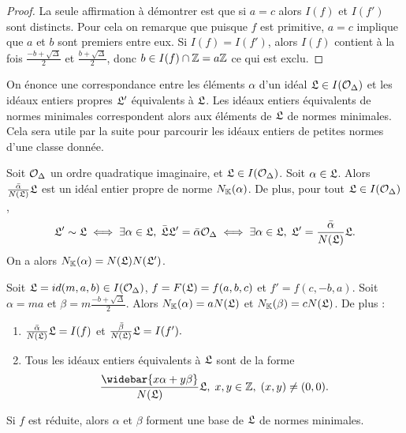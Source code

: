 \begin{proof}
	La seule affirmation à démontrer est que si $a = c$ alors $I(f)$ et $I(f')$ sont distincts. Pour cela on remarque que puisque $f$ est primitive, $a = c$ implique que $a$ et $b$ sont premiers entre eux. Si $I(f) = I(f')$, alors $I(f)$ contient à la fois $\frac{-b + \sqrt{\Delta}}{2}$ et $\frac{b + \sqrt{\Delta}}{2}$, donc $b\in I(f)\cap\mathbb{Z} = a\mathbb{Z}$ ce qui est exclu. 
\end{proof}

On énonce une correspondance entre les éléments $\alpha$ d'un idéal $\mathfrak{L}\in I(\mathcal{O}_{\Delta})$ et les idéaux entiers propres $\mathfrak{L}'$ équivalents à $\mathfrak{L}$. Les idéaux entiers équivalents de normes minimales correspondent alors aux éléments de $\mathfrak{L}$ de normes minimales. Cela sera utile par la suite pour parcourir les idéaux entiers de petites normes d'une classe donnée. 

\begin{Prop}\label{correspondanceIdeqElement}
	Soit $\mathcal{O}_\Delta$ un ordre quadratique imaginaire, et $\mathfrak{L}\in I(\mathcal{O}_{\Delta})$. Soit $\alpha\in\mathfrak{L}$. Alors $\frac{\bar\alpha}{N(\mathfrak{L})}\mathfrak{L}$ est un idéal entier propre de norme $N_{\mathbb{K}}(\alpha)$. De plus, pour tout $\mathfrak{L}\in I(\mathcal{O}_{\Delta})$,
	\begin{equation*}
		\mathfrak{L}'\sim\mathfrak{L}\iff\exists\alpha\in\mathfrak{L},\;\bar{\mathfrak{L}}\mathfrak{L}' = \bar{\alpha}\mathcal{O}_{\Delta}\iff\exists\alpha\in\mathfrak{L},\;\mathfrak{L}' = \frac{\bar\alpha}{N(\mathfrak{L})}\mathfrak{L}.
	\end{equation*}
	On a alors $N_{\mathbb{K}}(\alpha) = N(\mathfrak{L})N(\mathfrak{L}')$.
\end{Prop}

\begin{Coro}\label{baseMinimalIdealRéduit}
	Soit $\mathfrak{L} = id(m,a,b)\in I(\mathcal{O}_{\Delta})$, $f = F(\mathfrak{L}) = f(a,b,c)$ et $f' = f(c,-b,a)$. Soit $\alpha = ma$ et $\beta = m\frac{-b + \sqrt{\Delta}}{2}$. Alors $N_{\mathbb{K}}(\alpha) = aN(\mathfrak{L})$ et $N_{\mathbb{K}}(\beta) = cN(\mathfrak{L})$.  De plus :
	\begin{enumerate}
		\item $\frac{\bar\alpha}{N(\mathfrak{L})}\mathfrak{L} = I(f)$ et $\frac{\bar\beta}{N(\mathfrak{L})}\mathfrak{L} = I(f').$
		\item Tous les idéaux entiers équivalents à $\mathfrak{L}$ sont de la forme
		\begin{equation*}
			\frac{\widebar{x\alpha + y\beta}}{N(\LR)}\LR,\;x,y\in\Z,\;(x,y)\neq (0,0).
		\end{equation*}
	\end{enumerate}
	Si $f$ est réduite, alors $\alpha$ et $\beta$ forment une base de $\mathfrak{L}$ de normes minimales.
\end{Coro}


